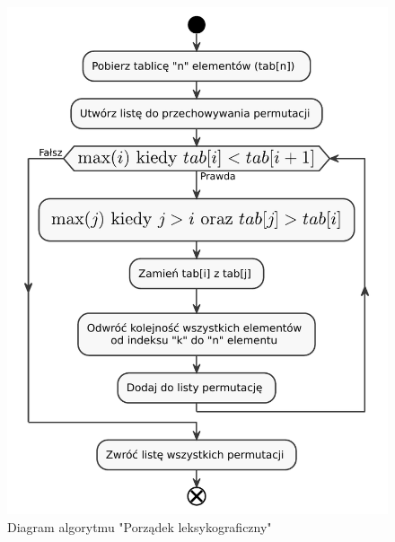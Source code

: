 \begin{figure}[H]
    \centering
    \includegraphics[scale=0.7]{chapters/chapter4/gen_perm.pdf}
    \caption{Diagram algorytmu "Porządek leksykograficzny"}
    \label{gen_perm}
\end{figure}
